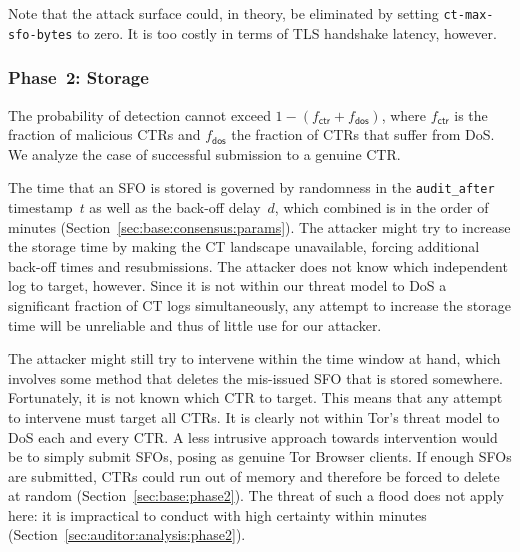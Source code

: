 Note that the attack surface could, in theory, be eliminated by setting
\texttt{ct-max-sfo-bytes} to zero.  It is too costly in terms of TLS
handshake latency, however.

\subsubsection{Phase~2: Storage} \label{sec:analysis:pr:phase2}
The probability of detection cannot exceed $1-(f_{\mathsf{ctr}} +
f_{\mathsf{dos}})$, where $f_{\mathsf{ctr}}$ is the fraction of
malicious CTRs and $f_{\mathsf{dos}}$ the fraction of CTRs that suffer from
DoS.  We analyze the case of successful submission to a genuine CTR.

The time that an SFO is stored is governed by randomness in the
\texttt{audit\_after} timestamp~$t$ as well as the back-off delay~$d$,
which combined is in the order of minutes
	(Section~\ref{sec:base:consensus:params}).
The attacker might try to increase the storage time by making the CT landscape
unavailable, forcing additional back-off times and resubmissions.  The attacker
does not know which independent log to target, however.  Since it is not within
our threat model to DoS a significant fraction of CT logs simultaneously, any
attempt to increase the storage time will be unreliable and thus of little use
for our attacker.

The attacker might still try to intervene within the time window at hand, which
involves some method that deletes the mis-issued SFO that is stored somewhere.
Fortunately, it is not known which CTR to target.
This means that any attempt to intervene must target all CTRs.  It is clearly
not within Tor's threat model to DoS each and every CTR.  A less intrusive
approach towards intervention would be to simply submit SFOs, posing as genuine
Tor Browser clients.  If enough SFOs are submitted, CTRs could run out of memory
and therefore be forced to delete at random (Section~\ref{sec:base:phase2}).
The threat of such a flood does not apply here:
	it is impractical to conduct with high certainty within minutes
	(Section~\ref{sec:auditor:analysis:phase2}).

